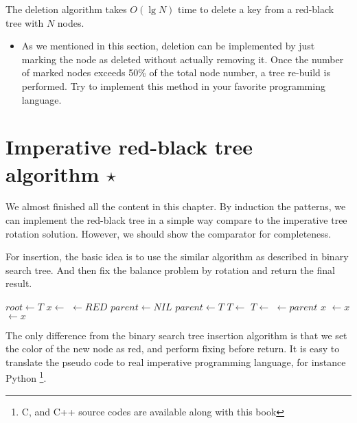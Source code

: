 \documentclass{article}
\begin{document}
The deletion algorithm takes $O(\lg N)$ time to delete a key from
a red-black tree with $N$ nodes.

\begin{Exercise}

\begin{itemize}
\item As we mentioned in this section, deletion can be implemented
by just marking the node as deleted without actually removing it.
Once the number of marked nodes exceeds 50\% of the total node
number, a tree re-build is performed. Try to implement this
method in your favorite programming language.
\end{itemize}

\end{Exercise}

\section{Imperative red-black tree algorithm $\star$}

We almost finished all the content in this chapter. By induction
the patterns, we can implement the red-black tree in a simple way
compare to the imperative tree rotation solution. However, we
should show the comparator for completeness.

For insertion, the basic idea is to use the similar algorithm
as described in binary search tree. And then fix the balance
problem by rotation and return the final result.

\begin{algorithmic}[1]
  \State $root \gets T$
  \State $x \gets$ 
  \State {} $\gets RED$
  \State $parent \gets NIL$
    \State $parent \gets T$
      \State $T \gets $ 
    \Else
      \State $T \gets $ 
    \EndIf
  \EndWhile
  \State {} $\gets parent$
   
    \State \Return $x$
    \State {} $\gets x$
  \Else
    \State {} $\gets x$
  \EndIf
  \State \Return {}
\EndFunction
\end{algorithmic}

The only difference from the binary search tree insertion algorithm
is that we set the color of the new node as red, and perform fixing
before return. It is easy to translate the pseudo code to real
imperative programming language, for instance Python \footnote{C,
and C++ source codes are available along with this book}.
\end{document}
